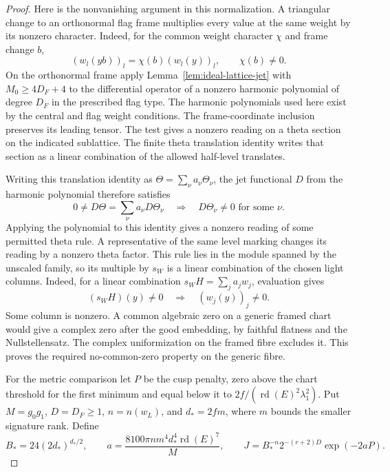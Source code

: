 \begin{proof}
Here is the nonvanishing argument in this normalization.
A triangular change to an orthonormal flag frame multiplies
every value at the same weight by its nonzero character.
Indeed, for the common weight character \(\chi\) and frame change \(b\),
\[
  (w_l(yb))_l=\chi(b)(w_l(y))_l,\qquad \chi(b)\ne0 .
\]
On the orthonormal frame apply Lemma~\ref{lem:ideal-lattice-jet}
with \(M_0\ge4D_F+4\) to the differential operator of a nonzero harmonic polynomial
of degree \(D_F\) in the prescribed flag type. The harmonic
polynomials used here exist by the central and flag weight
conditions. The frame-coordinate inclusion preserves
its leading tensor. The test gives a nonzero reading on
a theta section on the indicated sublattice. The finite
theta translation identity writes that section as a linear
combination of the allowed half-level translates.

Writing this translation identity as \(\Theta=\sum_\nu a_\nu\Theta_\nu\), the jet functional \(D\) from the harmonic polynomial therefore satisfies
\[
  0\ne D\Theta=\sum_\nu a_\nu D\Theta_\nu\quad\Longrightarrow\quad D\Theta_\nu\ne0\text{ for some }\nu.
\]
 Applying
the polynomial to this identity gives a nonzero reading
of some permitted theta rule. A representative of the
same level marking changes its reading by a nonzero
theta factor. This rule lies in the module spanned by
the unscaled family, so its multiple by \(s_W\) is a
linear combination of the chosen light columns.
Indeed, for a linear combination \(s_W H=\sum_j a_j w_j\), evaluation gives
\[
  (s_WH)(y)\ne0\quad\Longrightarrow\quad (w_j(y))_j\ne0 .
\]
 Some
column is nonzero. A common algebraic zero on a generic
framed chart would give a complex zero after the good
embedding, by faithful flatness and the Nullstellensatz.
The complex uniformization on the framed fibre excludes
it. This proves the required no-common-zero property on
the generic fibre.
\label{cor:slice-light-2}

For the metric comparison let \(P\) be the cusp penalty,
zero above the chart threshold for the first minimum and
equal below it to
\(2f/(\operatorname{rd}(E)^2\lambda_1^2)\).
Put \(M=g_0g_1\), \(D=D_F\ge1\), \(n=n(w_L)\), and
\(d_*=2fm\), where \(m\) bounds the smaller signature rank.
Define
\[
 B_*=24(2d_*)^{d_*/2},\qquad
 a=\frac{8100\pi n m^4 d_*^4\operatorname{rd}(E)^7}{M},\qquad
 J=B_*^{-n}2^{-(r+2)D}\exp(-2aP).
\]


\end{proof}
